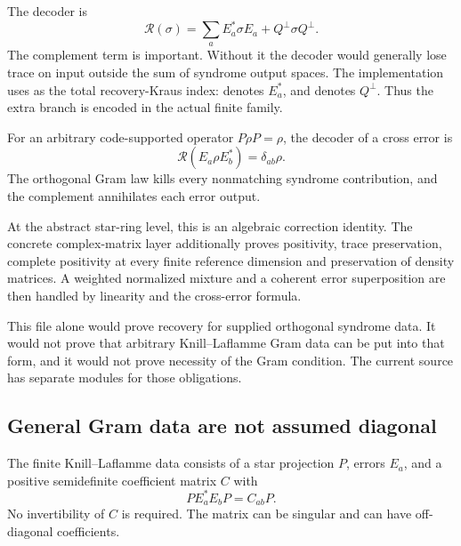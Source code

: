 
The decoder is
\[
\mathcal R(\sigma)=\sum_aE_a^*\sigma E_a+Q^\perp\sigma Q^\perp.
\]
The complement term is important. Without it the decoder would generally lose trace on input outside the sum of syndrome output spaces. The implementation uses  as the total recovery-Kraus index:  denotes $E_a^*$, and  denotes $Q^\perp$. Thus the extra branch is encoded in the actual finite family.



For an arbitrary code-supported operator $P\rho P=\rho$, the decoder of a cross error is
\[
\mathcal R(E_a\rho E_b^*)=\delta_{ab}\rho.
\]
The orthogonal Gram law kills every nonmatching syndrome contribution, and the complement annihilates each error output.


At the abstract star-ring level, this is an algebraic correction identity. The concrete complex-matrix layer additionally proves positivity, trace preservation, complete positivity at every finite reference dimension and preservation of density matrices. A weighted normalized mixture and a coherent error superposition are then handled by linearity and the cross-error formula.

This file alone would prove recovery for supplied orthogonal syndrome data. It would not prove that arbitrary Knill--Laflamme Gram data can be put into that form, and it would not prove necessity of the Gram condition. The current source has separate modules for those obligations.

\subsection{General Gram data are not assumed diagonal}
The finite Knill--Laflamme data consists of a star projection $P$, errors $E_a$, and a positive semidefinite coefficient matrix $C$ with
\[
PE_a^*E_bP=C_{ab}P.
\]
No invertibility of $C$ is required. The matrix can be singular and can have off-diagonal coefficients.

